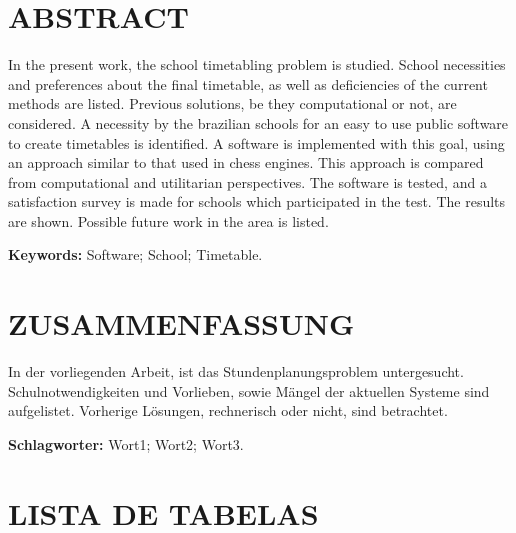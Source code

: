 \documentclass[12pt,a4paper]{article}
\begin{document}
	\thispagestyle{empty}
	\section*{ABSTRACT}

	In the present work, the school timetabling problem is studied. School necessities and preferences about the final timetable, as well as deficiencies of the current methods are listed. Previous solutions, be they computational or not, are considered. A necessity by the brazilian schools for an easy to use public software to create timetables is identified. A software is implemented with this goal, using an approach similar to that used in chess engines. This approach is compared from computational and utilitarian perspectives. The software is tested, and a satisfaction survey is made for schools which participated in the test. The results are shown. Possible future work in the area is listed.

	\begingroup
		\setlength{\parindent}{0mm}
		\textbf{Keywords:} Software; School; Timetable.
	\endgroup

	\newpage


	\thispagestyle{empty}
	\section*{ZUSAMMENFASSUNG}

	In der vorliegenden Arbeit, ist das Stundenplanungsproblem untergesucht. Schulnotwendigkeiten und Vorlieben, sowie Mängel der aktuellen Systeme sind aufgelistet. Vorherige Lösungen, rechnerisch oder nicht, sind betrachtet.

	\lipsum[1]


	\begingroup
		\setlength{\parindent}{0mm}
		\textbf{Schlagworter:} Wort1; Wort2; Wort3.
	\endgroup

	\newpage

	\thispagestyle{empty}
	\section*{LISTA DE TABELAS}

	\listoftables

	\newpage
\end{document}
